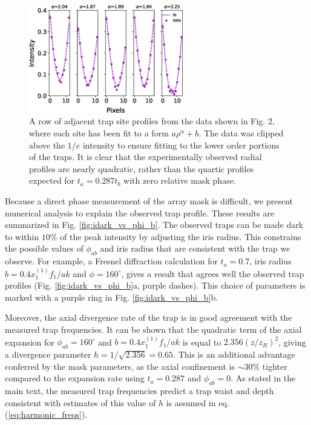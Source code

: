 \begin{figure}[t!]
    \centering
    \includegraphics[width=0.6\textwidth]{Images/figure8.eps}
    \caption{A row of adjacent trap site profiles from the data shown in Fig. 2, where each site has been fit to a form $a\rho^\alpha+b$. The data was clipped above the $1/e$ intensity to ensure fitting to the lower order portions of the traps. It is clear that the experimentally observed radial profiles are nearly quadratic, rather than the quartic profiles expected for $t_a=0.287t_b$ with zero relative mask phase.}
    \label{fig:site_fits}
\end{figure}

Because a direct phase measurement of the array mask is difficult, we present numerical analysis to explain the observed trap profile. These results are summarized in Fig. \ref{fig:idark_vs_phi_b}. The observed traps can be made dark to within $10\%$ of the peak intensity by adjusting the iris radius. This constrains the possible values of $\phi_{ab}$ and iris radius that are consistent with the trap we observe. For example, a Fresnel diffraction calculation for $t_a=0.7$, iris radius $b=0.4x^{(1)}_1 f_1/a k$ and $\phi=160^{\circ}$, gives a result that agrees well the observed trap profiles (Fig. \ref{fig:idark_vs_phi_b}a, purple dashes). This choice of parameters is marked with a purple ring in Fig. \ref{fig:idark_vs_phi_b}b.

Moreover, the axial divergence rate of the trap is in good agreement with the measured trap frequencies. It can be shown that the quadratic term of the axial expansion for $\phi_{ab}=160^{\circ}$ and $b=0.4x^{(1)}_1 f_1/a k$ is equal to $2.356(z/z_R)^2$, giving a divergence parameter $h=1/\sqrt{2.356}=0.65$. This is an additional advantage conferred by the mask parameters, as the axial confinement is $\sim 30\%$ tighter compared to the expansion rate using $t_a=0.287$ and $\phi_{ab}=0$. As stated in the main text, the measured trap frequencies predict a trap waist and depth consistent with estimates of this value of $h$ is assumed in eq. (\ref{eq:harmonic_freqs}).

